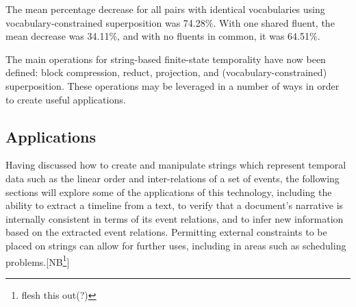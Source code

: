 \documentclass[a4paper,12pt,leqno]{article}
\newcommand{\selfnote}[1]{{\color{red}[NB\footnote{{\color{red}#1}}]}}
\newcommand{\nb}{\selfnote}
\begin{document}
The mean percentage decrease for all pairs with identical vocabularies using vocabulary-constrained superposition was 74.28\%. With one shared fluent, the mean decrease was 34.11\%, and with no fluents in common, it was 64.51\%.

The main operations for string-based finite-state temporality have now been defined: block compression, reduct, projection, and (vocabulary-constrained) superposition. These operations may be leveraged in a number of ways in order to create useful applications.

\subsection{Applications}\label{sub:applications}
Having discussed how to create and manipulate strings which represent temporal data such as the linear order and inter-relations of a set of events, the following sections will explore some of the applications of this technology, including the ability to extract a timeline from a text, to verify that a document's narrative is internally consistent in terms of its event relations, and to infer new information based on the extracted event relations. Permitting external constraints to be placed on strings can allow for further uses, including in areas such as scheduling problems.\nb{flesh this out(?)}
\end{document}
